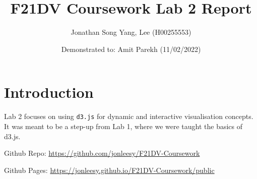 \documentclass{scrreprt}
\title{F21DV Coursework Lab 2 Report}
\author{Jonathan Song Yang, Lee (H00255553)}
\date{Demonstrated to: Amit Parekh (11/02/2022)}
\begin{document}
\maketitle

\newpage
\tableofcontents



\newpage
\chapter{Introduction}
Lab 2 focuses on using \verb|d3.js| for dynamic and interactive visualisation concepts. It was meant to be a step-up from Lab 1, where we were taught the basics of d3.js. 
\par Github Repo: \href{https://github.com/jonleesy/F21DV-Coursework}{https://github.com/jonleesy/F21DV-Coursework}
\par Github Pages: \href{https://jonleesy.github.io/F21DV-Coursework/public}{https://jonleesy.github.io/F21DV-Coursework/public}
\end{document}
